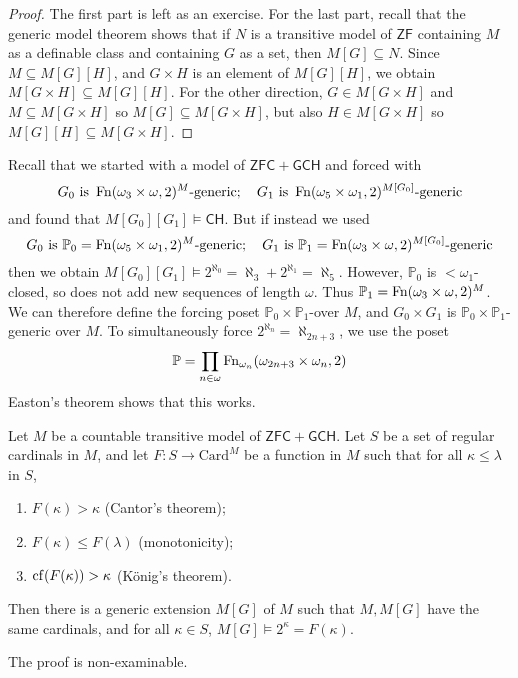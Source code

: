 \begin{proof}
    The first part is left as an exercise.
    For the last part, recall that the generic model theorem shows that if \( N \) is a transitive model of \( \mathsf{ZF} \) containing \( M \) as a definable class and containing \( G \) as a set, then \( M[G] \subseteq N \).
    Since \( M \subseteq M[G][H] \), and \( G \times H \) is an element of \( M[G][H] \), we obtain \( M[G \times H] \subseteq M[G][H] \).
    For the other direction, \( G \in M[G \times H] \) and \( M \subseteq M[G \times H] \) so \( M[G] \subseteq M[G \times H] \), but also \( H \in M[G \times H] \) so \( M[G][H] \subseteq M[G \times H] \).
\end{proof}
Recall that we started with a model of \( \mathsf{ZFC} + \mathsf{GCH} \) and forced with
\[ G_0 \text{ is } \operatorname{Fn}(\omega_3 \times \omega, 2)^M \text{-generic};\quad G_1 \text{ is } \operatorname{Fn}(\omega_5 \times \omega_1, 2)^{M[G_0]} \text{-generic} \]
and found that \( M[G_0][G_1] \vDash \mathsf{CH} \).
But if instead we used
\[ G_0 \text{ is } \mathbb P_0 = \operatorname{Fn}(\omega_5 \times \omega_1, 2)^M \text{-generic};\quad G_1 \text{ is } \mathbb P_1 = \operatorname{Fn}(\omega_3 \times \omega, 2)^{M[G_0]} \text{-generic} \]
then we obtain \( M[G_0][G_1] \vDash 2^{\aleph_0} = \aleph_3 + 2^{\aleph_1} = \aleph_5 \).
However, \( \mathbb P_0 \) is \( <\omega_1 \)-closed, so does not add new sequences of length \( \omega \).
Thus \( \mathbb P_1 = \operatorname{Fn}(\omega_3 \times \omega, 2)^M \).
We can therefore define the forcing poset \( \mathbb P_0 \times \mathbb P_1 \)-over \( M \), and \( G_0 \times G_1 \) is \( \mathbb P_0 \times \mathbb P_1 \)-generic over \( M \).
To simultaneously force \( 2^{\aleph_n} = \aleph_{2n + 3} \), we use the poset
\[ \mathbb P = \prod_{n \in \omega} \operatorname{Fn}_{\omega_n}(\omega_{2n + 3} \times \omega_n, 2) \]
Easton's theorem shows that this works.
\begin{theorem}
    Let \( M \) be a countable transitive model of \( \mathsf{ZFC} + \mathsf{GCH} \).
    Let \( S \) be a set of regular cardinals in \( M \), and let \( F : S \to \mathrm{Card}^M \) be a function in \( M \) such that for all \( \kappa \leq \lambda \) in \( S \),
    \begin{enumerate}
        \item \( F(\kappa) > \kappa \) (Cantor's theorem);
        \item \( F(\kappa) \leq F(\lambda) \) (monotonicity);
        \item \( \operatorname{cf}(F(\kappa)) > \kappa \) (K\"onig's theorem).
    \end{enumerate}
    Then there is a generic extension \( M[G] \) of \( M \) such that \( M, M[G] \) have the same cardinals, and for all \( \kappa \in S \), \( M[G] \vDash 2^\kappa = F(\kappa) \).
\end{theorem}
The proof is non-examinable.

